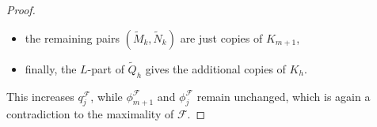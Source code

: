\documentclass[10pt,a4paper]{amsart}
\def\cF{{\mathcal F}}
\begin{document}
\begin{proof}
\begin{itemize}
                \item the remaining pairs $(\tilde M_k, \tilde N_k)$ are just copies of $K_{m+1}$, 
                \item finally, the $L$-part of $\tilde Q_h$ gives the additional copies of $K_h$.
            \end{itemize} 
            
            This increases $q_j^\cF$, while $\phi_{m+1}^\cF$ and $\phi_{j}^\cF$ remain unchanged, which is again a contradiction to the maximality of $\cF$.
        \end{proof}
\end{document}
